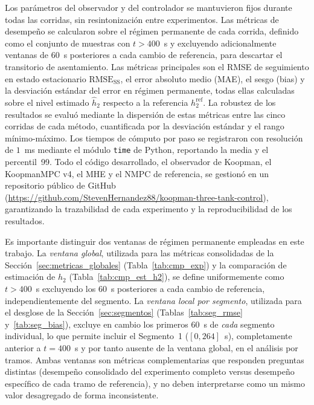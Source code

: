\documentclass[12pt,letterpaper]{article}
\begin{document}
Los parámetros del observador y del controlador se mantuvieron fijos 
durante todas las corridas, sin resintonización entre experimentos.
Las métricas de desempeño se calcularon sobre el régimen permanente de 
cada corrida, definido como el conjunto de muestras con $t > 400$~s y 
excluyendo adicionalmente ventanas de $60$~s posteriores a cada cambio 
de referencia, para descartar el transitorio de asentamiento. Las 
métricas principales son el RMSE de seguimiento en estado estacionario 
$\mathrm{RMSE}_{\mathrm{SS}}$, el error absoluto medio (MAE), el sesgo 
(bias) y la desviación estándar del error en régimen permanente, todas 
ellas calculadas sobre el nivel estimado $\hat{h}_2$ respecto a la 
referencia $h_2^{\mathrm{ref}}$. La robustez de los resultados se evaluó 
mediante la dispersión de estas métricas entre las cinco corridas de cada 
método, cuantificada por la desviación estándar y el rango 
mínimo-máximo. Los tiempos de cómputo por paso se registraron con 
resolución de $1$~ms mediante el módulo \texttt{time} de Python, 
reportando la media y el percentil~99. Todo el código desarrollado, el
observador de Koopman, el KoopmanMPC v4, el MHE y el NMPC de
referencia, se gestionó en un repositorio público de GitHub
(\url{https://github.com/StevenHernandez88/koopman-three-tank-control}),
garantizando la trazabilidad de cada experimento y la reproducibilidad
de los resultados.

Es importante distinguir dos ventanas de régimen permanente
empleadas en este trabajo. La \emph{ventana global}, utilizada
para las métricas consolidadas de la Sección~\ref{sec:metricas_globales}
(Tabla~\ref{tab:cmp_exp}) y la comparación de estimación de $h_2$
(Tabla~\ref{tab:cmp_est_h2}), se define uniformemente como
$t > 400$~s excluyendo los $60$~s posteriores a cada cambio de
referencia, independientemente del segmento. La \emph{ventana
local por segmento}, utilizada para el desglose de la
Sección~\ref{sec:segmentos} (Tablas~\ref{tab:seg_rmse}
y~\ref{tab:seg_bias}), excluye en cambio los primeros $60$~s de
\emph{cada} segmento individual, lo que permite incluir el
Segmento~1 ($[0, 264]$~s), completamente anterior a $t = 400$~s
y por tanto ausente de la ventana global, en el análisis por
tramos. Ambas ventanas son métricas complementarias que responden
preguntas distintas (desempeño consolidado del experimento completo
versus desempeño específico de cada tramo de referencia), y no
deben interpretarse como un mismo valor desagregado de forma
inconsistente.

\end{document}
